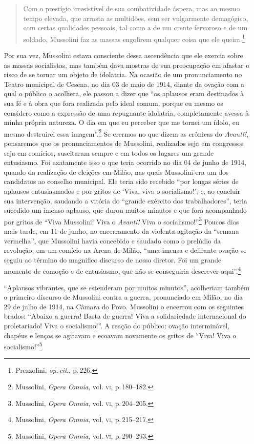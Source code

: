 \begin{quote}
Com o prestígio irresistível de sua combatividade áspera, mas ao mesmo
tempo elevada, que arrasta as multidões, sem ser vulgarmente demagógico,
com certas qualidades pessoais, tal como a de um crente fervoroso e de
um soldado, Mussolini faz as massas engolirem qualquer coisa que ele
queira.\footnote{Prezzolini, \emph{op.\,cit}., p.\,226.}
\end{quote}

Por sua vez, Mussolini estava consciente dessa ascendência que ele
exercia sobre as massas socialistas, mas também dava mostras de sua
preocupação em afastar o risco de se tornar um objeto de idolatria. Na
ocasião de um pronunciamento no Teatro municipal de Cesena, no dia 03 de
maio de 1914, diante da ovação com a qual o público o acolhera, ele
passou a dizer que ``os aplausos eram destinados à sua fé e à obra que
fora realizada pelo ideal comum, porque eu mesmo os considero como a
expressão de uma repugnante idolatria, completamente avessa à minha
própria natureza. O dia em que eu perceber que me tornei um ídolo, eu
mesmo destruirei essa imagem''.\footnote{Mussolini, \emph{Opera Omnia},
  vol. \textsc{vi}, p.\,180--182.} Se crermos no que dizem as crônicas do
\emph{Avanti!}, pensaremos que os pronunciamentos de Mussolini,
realizados seja em congressos seja em comícios, suscitaram sempre e em
todos os lugares um grande entusiasmo. Foi exatamente isso o que teria
ocorrido no dia 04 de junho de 1914, quando da realização de eleições em
Milão, nas quais Mussolini era um dos candidatos ao conselho municipal.
Ele teria sido recebido ``por longas séries de aplausos entusiasmados e
por gritos de `Viva, viva o socialismo!'; e, ao concluir sua
intervenção, saudando a vitória do ``grande exército dos
trabalhadores'', teria sucedido um imenso aplauso, que durou muitos
minutos e que fora acompanhado por gritos de ``Viva Mussolini! Viva o
\emph{Avanti!} Viva o socialismo!''\footnote{Mussolini, \emph{Opera
  Omnia}, vol. \textsc{vi}, p.\,204--205.} Poucos dias mais tarde, em 11 de junho,
no encerramento da violenta agitação da ``semana vermelha'', que
Mussolini havia concebido e saudado como o prelúdio da revolução, em um
comício na Arena de Milão, ``uma imensa e delirante ovação se seguiu ao
término do magnifico discurso de nosso diretor. Foi um grande momento de
comoção e de entusiasmo, que não se conseguiria descrever
aqui''.\footnote{Mussolini, \emph{Opera Omnia}, vol. \textsc{vi}, p.\,215--217.}

``Aplausos vibrantes, que se estenderam por muitos minutos'', acolheriam
também o primeiro discurso de Mussolini contra a guerra, pronunciado em
Milão, no dia 29 de julho de 1914, na Câmara do Povo. Mussolini o
encerrou com os seguintes brados: ``Abaixo a guerra! Basta de guerra!
Viva a solidariedade internacional do proletariado! Viva o
socialismo!''. A reação do público: ovação interminável, chapéus e
lenços se agitavam e ecoavam novamente os gritos de ``Viva! Viva o
socialismo!''\footnote{Mussolini, \emph{Opera Omnia}, vol. \textsc{vi}, p.\,290--293.}

